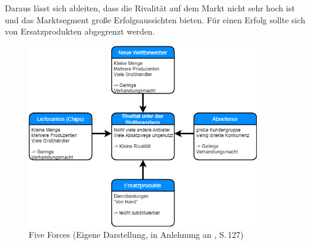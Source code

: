         \noindent
        Daraus lässt sich ableiten, dass die Rivalität auf dem Markt nicht sehr hoch ist und das Marktsegment große
        Erfolgsaussichten bieten. Für einen Erfolg sollte sich von Ersatzprodukten abgegrenzt werden.

        \begin{figure}[ht]
            \centering
            \includegraphics[width = 0.9\textwidth]{Eigene Darstellungen/Distributionswege2.png}

            \caption{Five Forces (Eigene Darstellung, in Anlehnung an \cite{Gamayanto2005}, S.\,127)}
        \end{figure}
















